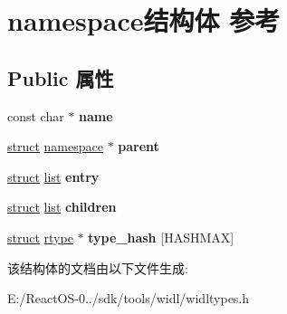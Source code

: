 \hypertarget{structnamespace}{}\section{namespace结构体 参考}
\label{structnamespace}
\subsection*{Public 属性}
\begin{DoxyCompactItemize}
\item 
\mbox{\label{structnamespace_ab0dedc211c26866a4b1ad11b203e631c}} 
const char $\ast$ {\bfseries name}
\item 
\mbox{\label{structnamespace_a46e26cd26c6f50eafd3cd48296ac6c04}} 
\hyperlink{interfacestruct}{struct} \hyperlink{structnamespace}{namespace} $\ast$ {\bfseries parent}
\item 
\mbox{\label{structnamespace_a62f11f4b10746cba9dfaa0708b8795b3}} 
\hyperlink{interfacestruct}{struct} \hyperlink{classlist}{list} {\bfseries entry}
\item 
\mbox{\label{structnamespace_afbf8b78468a4035e6c91a18e4dce0c3f}} 
\hyperlink{interfacestruct}{struct} \hyperlink{classlist}{list} {\bfseries children}
\item 
\mbox{\label{structnamespace_a850c0bf2349edeeb5333f1127add83fe}} 
\hyperlink{interfacestruct}{struct} \hyperlink{structrtype}{rtype} $\ast$ {\bfseries type\+\_\+hash} \mbox{[}H\+A\+S\+H\+M\+AX\mbox{]}
\end{DoxyCompactItemize}


该结构体的文档由以下文件生成\+:\begin{DoxyCompactItemize}
\item 
E\+:/\+React\+O\+S-\/0../sdk/tools/widl/widltypes.\+h\end{DoxyCompactItemize}
